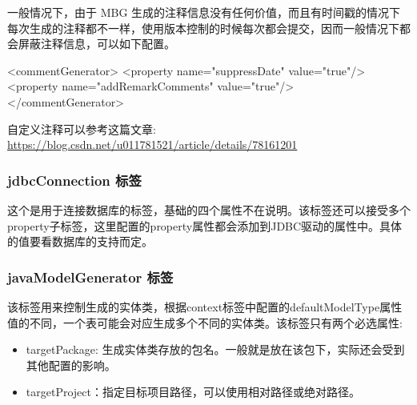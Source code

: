 一般情况下，由于 MBG 生成的注释信息没有任何价值，而且有时间戳的情况下每次生成的注释都不一样，使用版本控制的时候每次都会提交，因而一般情况下都会屏蔽注释信息，可以如下配置。

\begin{xml}
<commentGenerator>
    <property name="suppressDate" value="true"/>
    <property name="addRemarkComments" value="true"/>
</commentGenerator>
\end{xml}

自定义注释可以参考这篇文章: \url{https://blog.csdn.net/u011781521/article/details/78161201}

\subsubsection*{jdbcConnection 标签}

这个是用于连接数据库的标签，基础的四个属性不在说明。该标签还可以接受多个property子标签，这里配置的property属性都会添加到JDBC驱动的属性中。具体的值要看数据库的支持而定。

\subsubsection*{javaModelGenerator 标签}

该标签用来控制生成的实体类，根据context标签中配置的defaultModelType属性值的不同，一个表可能会对应生成多个不同的实体类。该标签只有两个必选属性:
\begin{itemize}
    \item targetPackage: 生成实体类存放的包名。一般就是放在该包下，实际还会受到其他配置的影响。
    \item targetProject：指定目标项目路径，可以使用相对路径或绝对路径。
\end{itemize}